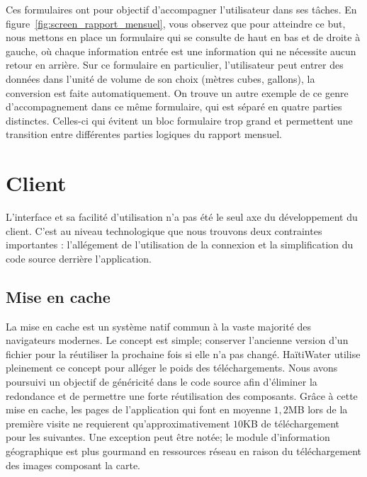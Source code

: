 \documentclass{EPL-master-thesis-covers-FR}
\begin{document}
			Ces formulaires ont pour objectif d'accompagner l'utilisateur dans ses tâches. En figure~\ref{fig:screen_rapport_mensuel}, vous observez que pour atteindre ce but, nous mettons en place un formulaire qui se consulte de haut en bas et de droite à gauche, où chaque information entrée est une information qui ne nécessite aucun retour en arrière. Sur ce formulaire en particulier, l'utilisateur peut entrer des données dans l'unité de volume de son choix (mètres cubes, gallons), la conversion est faite automatiquement. On trouve un autre exemple de ce genre d'accompagnement dans ce même formulaire, qui est séparé en quatre parties distinctes. Celles-ci qui évitent un bloc formulaire trop grand et permettent une transition entre différentes parties logiques du rapport mensuel.





		\section{Client}

			L'interface et sa facilité d'utilisation n'a pas été le seul axe du développement du client. C'est au niveau technologique que nous trouvons deux contraintes importantes : l'allégement de l'utilisation de la connexion et la simplification du code source derrière l'application.

			\subsection*{Mise en cache}
				\label{sec:cache_client}

				La mise en cache est un système natif commun à la vaste majorité des navigateurs modernes. Le concept est simple; conserver l'ancienne version d'un fichier pour la réutiliser la prochaine fois si elle n'a pas changé. HaïtiWater utilise pleinement ce concept pour alléger le poids des téléchargements. Nous avons poursuivi un objectif de généricité dans le code source afin d'éliminer la redondance et de permettre une forte réutilisation des composants. Grâce à cette mise en cache, les pages de l'application qui font en moyenne $1,2$MB lors de la première visite ne requierent qu'approximativement $10$KB de téléchargement pour les suivantes. Une exception peut être notée; le module d'information géographique est plus gourmand en ressources réseau en raison du téléchargement des images composant la carte.
\end{document}

